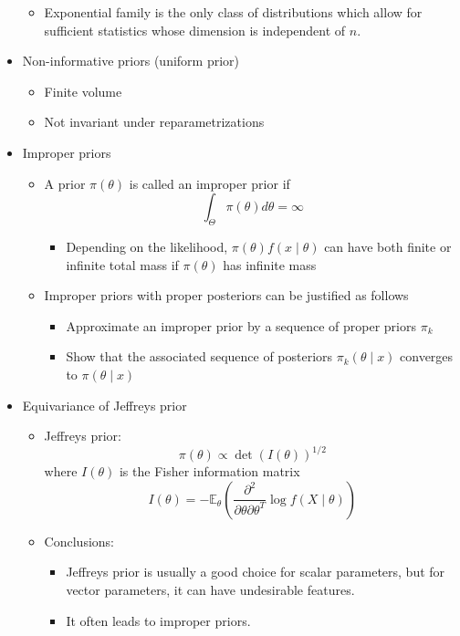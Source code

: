 \documentclass[a4paper]{article}
\begin{document}
\begin{itemize}
\begin{itemize}
        \item Exponential family is the only class of distributions which allow for sufficient statistics whose dimension is independent of $n$.
    \end{itemize}
    \item Non-informative priors (uniform prior)
    \begin{itemize}
        \item Finite volume
        \item Not invariant under reparametrizations
    \end{itemize}
    \item Improper priors
    \begin{itemize}
        \item A prior $\pi(\theta)$ is called an improper prior if
        \[\int_{\Theta}\pi(\theta)d\theta=\infty \]
        \begin{itemize}
            \item Depending on the likelihood, $\pi(\theta)f(x\mid\theta)$ can have both finite or infinite total mass if $\pi(\theta)$ has infinite mass
        \end{itemize}
        \item Improper priors with proper posteriors can be justified as follows
        \begin{itemize}
            \item Approximate an improper prior by a sequence of proper priors $\pi_k$
            \item Show that the associated sequence of posteriors $\pi_k(\theta\mid x)$ converges to $\pi(\theta\mid x)$
        \end{itemize}
    \end{itemize}
    \item Equivariance of Jeffreys prior
    \begin{itemize}
        \item Jeffreys prior:
        \[\pi(\theta)\propto\det(I(\theta))^{1/2} \]
        where $I(\theta)$ is the Fisher information matrix
        \[I(\theta)=-\mathbb{E}_{\theta}\left(\frac{\partial^2}{\partial\theta\partial\theta^T}\log f(X\mid\theta) \right) \]
        \item Conclusions:
        \begin{itemize}
            \item Jeffreys prior is usually a good choice for scalar parameters, but for vector parameters, it can have undesirable features.
            \item It often leads to improper priors.

\end{itemize}
\end{itemize}
\end{itemize}
\end{document}
